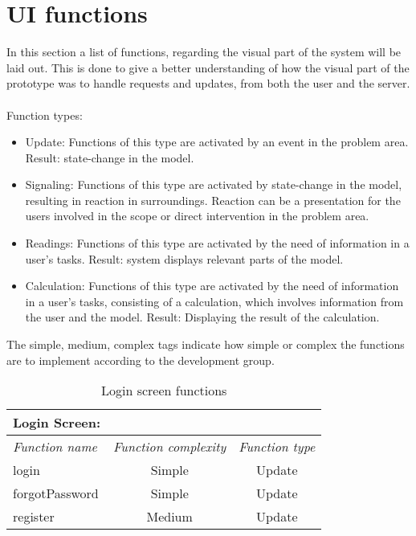 \newpage
\section{UI functions}
In this section a list of functions, regarding the visual part of the system will be laid out. This is done to give a better understanding of how the visual part of the prototype was to handle requests and updates, from both the user and the server.
\\
\\
Function types:
\begin{itemize}
\item{Update: Functions of this type are activated by an event in the problem area. Result: state-change in the model.}

\item{Signaling: Functions of this type are activated by state-change in the model, resulting in reaction in surroundings. Reaction can be a presentation for the users involved in the scope or direct intervention in the problem area.}

\item{Readings: Functions of this type are activated by the need of information in a user's tasks. Result: system displays relevant parts of the model.}

\item{Calculation: Functions of this type are activated by the need of information in a user's tasks, consisting of a calculation, which involves information from the user and the model. Result: Displaying the result of the calculation.}

\end{itemize}

The simple, medium, complex tags indicate how simple or complex the functions are to implement according to the development group.

\begin{table}[!ht]
\centering
\begin{tabular}{ l  c  c }

Login Screen: &  & \\ \hline
\textit{Function name} & \textit{Function complexity} & \textit{Function type} \\ \hline
login & Simple & Update \\ \hline
forgotPassword & Simple & Update \\ \hline
register & Medium & Update \\ \hline
\end{tabular}
\caption{Login screen functions}
\label{tbl:loginscreen}
\end{table}

